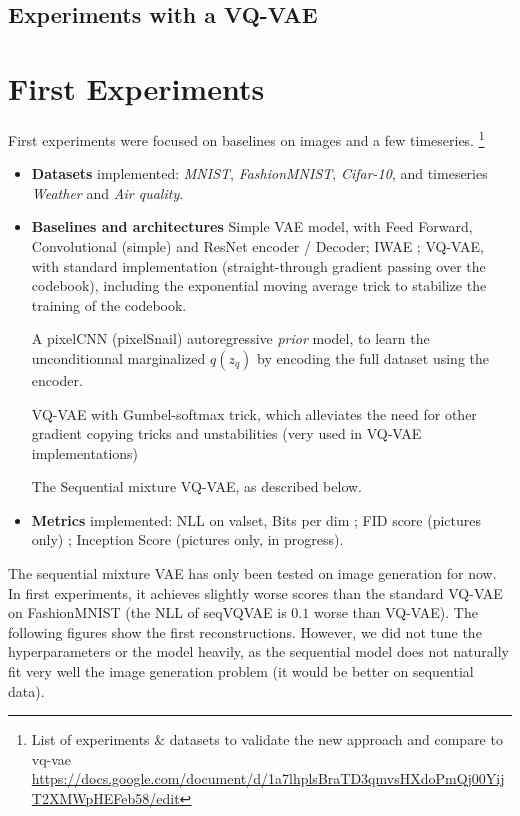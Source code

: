 \documentclass{article}
\begin{document}
\subsection{Experiments with a VQ-VAE}








\clearpage
\newpage

\section{First Experiments}
First experiments were focused on baselines on images and a few timeseries. \footnote{List of experiments \& datasets to validate the new approach and compare to vq-vae \url{https://docs.google.com/document/d/1a7lhplsBraTD3qmvsHXdoPmQj00YijT2XMWpHEFeb58/edit}}

\begin{itemize}
	\item \textbf{Datasets} implemented: {\em MNIST}, {\em FashionMNIST}, {\em Cifar-10}, and timeseries {\em Weather} and {\em Air quality}.
	\item \textbf{Baselines and architectures} Simple VAE model, with Feed Forward, Convolutional (simple) and ResNet encoder / Decoder; IWAE ; VQ-VAE, with standard implementation (straight-through gradient passing over the codebook), including the exponential moving average trick to stabilize the training of the codebook.

	A pixelCNN (pixelSnail) autoregressive \textit{prior} model, to learn the unconditionnal marginalized $q(z_q)$ by encoding the full dataset using the encoder.

	VQ-VAE with Gumbel-softmax trick, which alleviates the need for other gradient copying tricks and unstabilities (very used in VQ-VAE implementations)

	The Sequential mixture VQ-VAE, as described below.
  \item \textbf{Metrics} implemented: NLL on valset, Bits per dim ; FID score (pictures only) ; Inception Score (pictures only, in progress).
\end{itemize}

The sequential mixture VAE has only been tested on image generation for now. In first experiments, it achieves slightly worse scores than the standard VQ-VAE on FashionMNIST (the NLL of seqVQVAE is $0.1$ worse than VQ-VAE). The following figures show the first reconstructions. However, we did not tune the hyperparameters or the model heavily, as the sequential model does not naturally fit very well the image generation problem (it would be better on sequential data).
\end{document}
